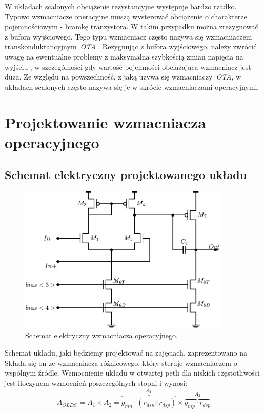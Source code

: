 \documentclass[twoside,pl,final]{labman}
\begin{document}
W układach scalonych obciążenie rezystancyjne występuje bardzo rzadko.
Typowo wzmacniacze operacyjne muszą wysterować obciążenie
o charakterze pojemnościowym - bramkę tranzystora.
W takim przypadku można zrezygnować z bufora wyjściowego.
Tego typu wzmacniacz często nazywa się wzmacniaczem
transkonduktancyjnym~\emph{OTA} .
Rezygnując z bufora wyjściowego, należy zwrócić uwagę na
ewentualne problemy z maksymalną szybkością zmian napięcia
na wyjściu , w szczególności gdy
wartość pojemności obciążająca wzmacniacz jest duża.
Ze względu na powszechność, z jaką używa się wzmacniaczy~\emph{OTA},
w układach scalonych często nazywa się je w skrócie wzmacniaczami operacyjnymi.

\chapter{Projektowanie wzmacniacza operacyjnego}
\label{opamp}

\section{Schemat elektryczny projektowanego układu}
\label{opamp:schematic}
\begin{figure}[!htbp]
  \centering
  \includegraphics[width=0.9\textwidth]{schematic}
  \caption{Schemat elektryczny wzmacniacza operacyjnego.}
  \label{fig:schematic}
\end{figure}

Schemat układu, jaki będziemy projektować
na zajęciach, zaprezentowano na~
Składa się on ze wzmacniacza różnicowego, który steruje
wzmacniaczem o wspólnym źródle.
Wzmocnienie układu w otwartej pętli dla niskich częstotliwości
jest iloczynem wzmocnień poszczególnych stopni i wynosi:
\begin{equation}
  A_{OLDC} = A_1 \times A_2 =
    \overbrace{g_{mn} \cdot (r_{dsn} || r_{dsp})}^{A_1} \times
    \overbrace{g_{mp} \cdot r_{dsp}}^{A_2}
\end{equation}
\end{document}
